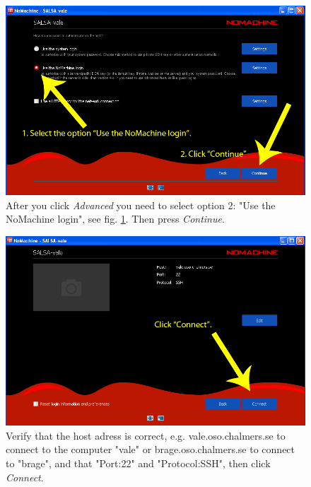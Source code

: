 \begin{figure}[H]
    \centering
    \includegraphics[height=0.25\paperheight]{../figures/nomachinefigs/fig3_advanced.png}
    \caption{After you click \emph{Advanced} you need to select option 2: "Use the NoMachine login", see fig. \ref{fig:advanced}. Then press \emph{Continue}.}
    \label{fig:advanced}
\end{figure}

\begin{figure}[H]
    \centering
    \includegraphics[height=0.25\paperheight]{../figures/nomachinefigs/fig4_connect.png}
    \caption{Verify that the host adress is correct, e.g. vale.oso.chalmers.se to connect to the computer "vale" or brage.oso.chalmers.se to connect to "brage", and that "Port:22" and "Protocol:SSH", then click \emph{Connect}.}
    \label{fig:connect}
\end{figure}

